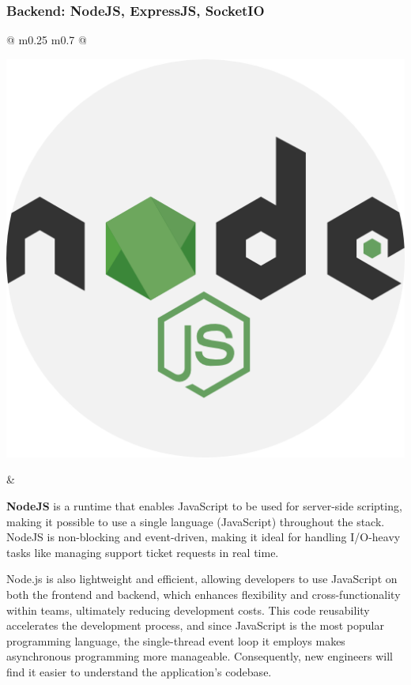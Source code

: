 	
	\subsubsection{Backend: NodeJS, ExpressJS, SocketIO}
	
	\vspace*{0.5 cm}
	\begin{tabular}{ @{} m{0.25\textwidth} m{0.7\textwidth} @{} }
		\begin{minipage}{\linewidth}
			\centering
			\includegraphics[width=0.5\linewidth]{graphics/nodejs.png}
			\label{fig:nodejs}
		\end{minipage}
		&
		\begin{minipage}{\linewidth}
			\textbf{NodeJS} is a runtime that enables JavaScript to be used for server-side scripting, making it possible to use a single language (JavaScript) throughout the stack. NodeJS is non-blocking and event-driven, making it ideal for handling I/O-heavy tasks like managing support ticket requests in real time. \cite{nodejs-about}
			
			Node.js is also lightweight and efficient, allowing developers to use JavaScript on both the frontend and backend, which enhances flexibility and cross-functionality within teams, ultimately reducing development costs. This code reusability accelerates the development process, and since JavaScript is the most popular programming language, the single-thread event loop it employs makes asynchronous programming more manageable. Consequently, new engineers will find it easier to understand the application’s codebase. \cite{why-nodejs}
		\end{minipage}
	\end{tabular}
	
	\vspace*{0.8cm}
	
